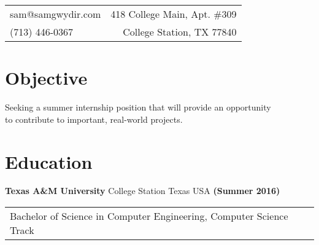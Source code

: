 \documentclass[margin,line,12pt]{res}
\newenvironment{list1}{
\begin{list}{\ding{113}}{%
  \setlength{\itemsep}{0in}
  \setlength{\parsep}{0in} \setlength{\parskip}{0in}
  \setlength{\topsep}{0in} \setlength{\partopsep}{0in}
  \setlength{\leftmargin}{0.17in}}}{\end{list}}
\newenvironment{list2}{
\begin{list}{$\bullet$}{%
  \setlength{\itemsep}{0in}
  \setlength{\parsep}{0in} \setlength{\parskip}{0in}
  \setlength{\topsep}{0in} \setlength{\partopsep}{0in}
  \setlength{\leftmargin}{0.2in}}}{\end{list}}
\begin{document}
\hfill
\vspace*{-.45in}
\begin{tabular}{l r}
sam@samgwydir.com & 418 College Main, Apt. \#309\\
(713) 446-0367 & College Station, TX 77840
\end{tabular}

\vspace*{.1in}
{\color{Black}
\begin{resume}

{\color{Black}
  \section{\sc Objective}}
Seeking a summer internship position that will provide an opportunity \\
to contribute to important, real-world projects.

\color{black}
{\color{Black}
  \vspace{-.1in}
  \section{\sc Education}}

{\bf Texas A\&M University} College Station Texas USA \hfill {\bf (Summer 2016)} \ \\
\vspace*{-.17in}
\begin{tabular}{l l l}
  Bachelor of Science in Computer Engineering, Computer Science Track \\
\end{tabular}



\end{resume}}
\end{document}
